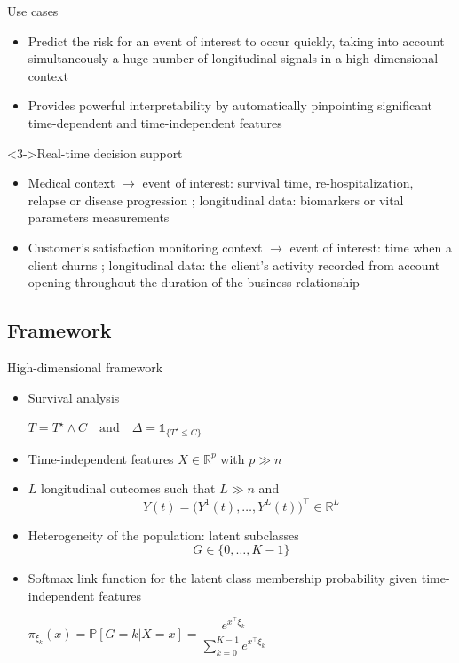 \documentclass{beamer}
\newcommand{\R}{\mathbb R}
\renewcommand{\P}{\mathds{P}}
\newcommand{\ind}[1]{\mathds{1}_{#1}}
\renewcommand{\P}{\mathds P}
\begin{document}
\begin{frame}{Use cases}

\small
\begin{itemize}
  \item<1-> Predict the risk for an event of interest to occur quickly, taking into account simultaneously a huge number of longitudinal signals in a high-dimensional context
  \item<2-> Provides powerful interpretability by automatically pinpointing significant time-dependent and time-independent features
\end{itemize}

\begin{block}<3->{Real-time decision support}
\begin{itemize}
  \item<3-> Medical context $\rightarrow$ event of interest: survival time, re-hospitalization, relapse or disease progression ; longitudinal data: biomarkers or vital parameters measurements
  \item<4-> Customer's satisfaction monitoring context $\rightarrow$ event of interest: time when a client churns ; longitudinal data: the client's activity recorded from account opening throughout the duration of the business relationship
\end{itemize}
\end{block}

\end{frame}

\subsection{Framework}

\begin{frame}{High-dimensional framework}

\small
\begin{itemize}
  \item<1-> Survival analysis
  \begin{center}
  $T = T^\star \wedge C \quad \text{and} \quad \Delta = \ind{\{T^\star \leq C\}}$
  \end{center}
  \item<2-> Time-independent features $X \in \R^p$ with $p \gg n$
  \item<3-> $L$ longitudinal outcomes such that $L \gg n$ and \[Y(t) = \big(Y^1(t), \ldots, Y^L(t) \big)^\top \in \R^L\]
  \item<4-> Heterogeneity of the population: latent subclasses \[G \in \{ 0, \ldots, K-1\}\]
  \item<5-> Softmax link function for the latent class membership probability given time-independent features
  \begin{center}
  $\pi_{\xi_k}(x) = \P[G=k|X=x] = \dfrac{e^{x^\top\xi_k}}{\sum_{k=0}^{K-1}e^{x^\top\xi_k}}$
  \end{center}
\end{itemize}

\end{frame}
\end{document}
